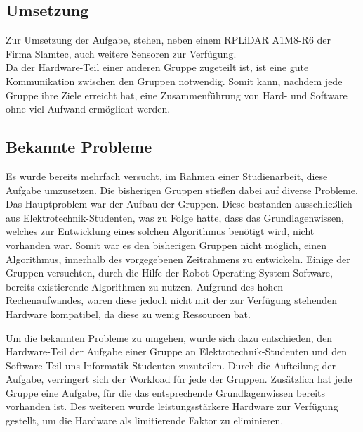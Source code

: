 \subsection{Umsetzung}
Zur Umsetzung der Aufgabe, stehen, neben einem RPLiDAR A1M8-R6 der Firma Slamtec, auch weitere Sensoren zur Verfügung. \\
Da der Hardware-Teil einer anderen Gruppe zugeteilt ist, ist eine gute Kommunikation zwischen den Gruppen notwendig. Somit kann, nachdem jede Gruppe ihre Ziele erreicht hat, eine Zusammenführung von Hard- und Software ohne viel Aufwand ermöglicht werden. \\

\subsection{Bekannte Probleme}
    Es wurde bereits mehrfach versucht, im Rahmen einer Studienarbeit, diese Aufgabe umzusetzen.
    Die bisherigen Gruppen stießen dabei auf diverse Probleme.
    Das Hauptproblem war der Aufbau der Gruppen.
    Diese bestanden ausschließlich aus Elektrotechnik-Studenten, was zu Folge hatte, dass das Grundlagenwissen, welches zur Entwicklung eines solchen Algorithmus benötigt wird, nicht vorhanden war.
    Somit war es den bisherigen Gruppen nicht möglich, einen Algorithmus, innerhalb des vorgegebenen Zeitrahmens zu entwickeln.
    Einige der Gruppen versuchten, durch die Hilfe der Robot-Operating-System-Software, bereits existierende Algorithmen zu nutzen. 
    Aufgrund des hohen Rechenaufwandes, waren diese jedoch nicht mit der zur Verfügung stehenden Hardware kompatibel, da diese zu wenig Ressourcen bat.

    Um die bekannten Probleme zu umgehen, wurde sich dazu entschieden, den Hardware-Teil der Aufgabe einer Gruppe an Elektrotechnik-Studenten und den Software-Teil uns Informatik-Studenten zuzuteilen.
    Durch die Aufteilung der Aufgabe, verringert sich der Workload für jede der Gruppen. 
    Zusätzlich hat jede Gruppe eine Aufgabe, für die das entsprechende Grundlagenwissen bereits vorhanden ist.
    Des weiteren wurde leistungsstärkere Hardware zur Verfügung gestellt, um die Hardware als limitierende Faktor zu eliminieren.

\newpage

